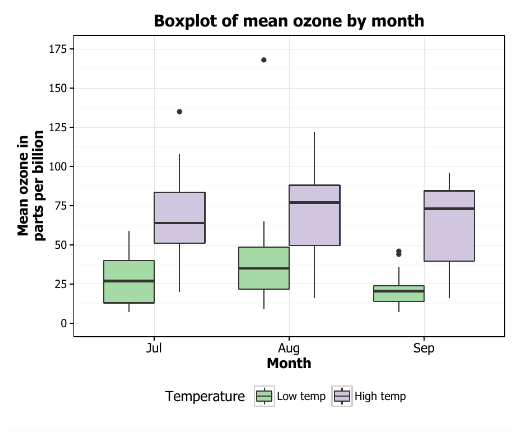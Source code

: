 \documentclass[]{article}
\begin{document}
\begin{center}\includegraphics{10_Boxplots_pdf/box_19-1} \end{center}
\end{document}
